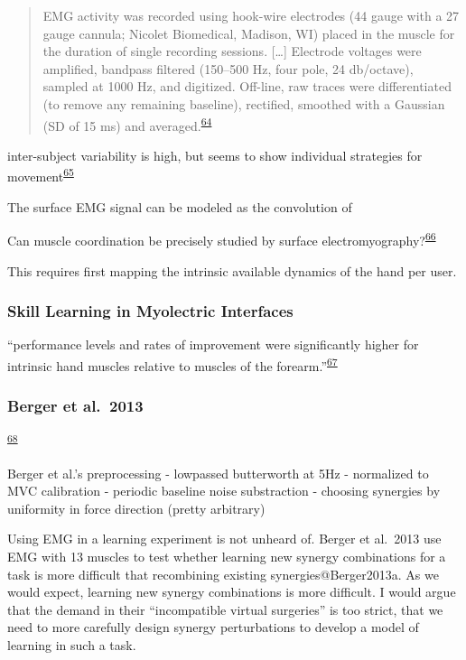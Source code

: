 \documentclass[
  a4paper,
]{article}
\begin{document}
\begin{quote}
EMG activity was recorded using hook-wire electrodes (44 gauge with a 27
gauge cannula; Nicolet Biomedical, Madison, WI) placed in the muscle for
the duration of single recording sessions. {[}\ldots{]} Electrode
voltages were amplified, bandpass filtered (150--500 Hz, four pole, 24
db/octave), sampled at 1000 Hz, and digitized. Off-line, raw traces were
differentiated (to remove any remaining baseline), rectified, smoothed
with a Gaussian (SD of 15 ms) and
averaged.\textsuperscript{\protect\hyperlink{ref-churchlandNeuralVariabilityPremotor2006}{64}}
\end{quote}

inter-subject variability is high, but seems to show individual
strategies for
movement\textsuperscript{\protect\hyperlink{ref-crouzierIndividualDifferencesDistribution2019}{65}}

The surface EMG signal can be modeled as the convolution of

Can muscle coordination be precisely studied by surface
electromyography?\textsuperscript{\protect\hyperlink{ref-Hug2011}{66}}

This requires first mapping the intrinsic available dynamics of the hand
per user.

\hypertarget{skill-learning-in-myolectric-interfaces}{%
\subsubsection{Skill Learning in Myolectric
Interfaces}\label{skill-learning-in-myolectric-interfaces}}

``performance levels and rates of improvement were significantly higher
for intrinsic hand muscles relative to muscles of the
forearm.''\textsuperscript{\protect\hyperlink{ref-Dyson2018}{67}}

\hypertarget{berger-et-al.-2013}{%
\subsubsection{Berger et al.~2013}\label{berger-et-al.-2013}}

\textsuperscript{\protect\hyperlink{ref-BergerDifferencesInAdaptationRates2013a}{68}}

Berger et al.'s preprocessing - lowpassed butterworth at 5Hz -
normalized to MVC calibration - periodic baseline noise substraction -
choosing synergies by uniformity in force direction (pretty arbitrary)

Using EMG in a learning experiment is not unheard of. Berger et al.~2013
use EMG with 13 muscles to test whether learning new synergy
combinations for a task is more difficult that recombining existing
synergies@Berger2013a. As we would expect, learning new synergy
combinations is more difficult. I would argue that the demand in their
``incompatible virtual surgeries'' is too strict, that we need to more
carefully design synergy perturbations to develop a model of learning in
such a task.
\end{document}
